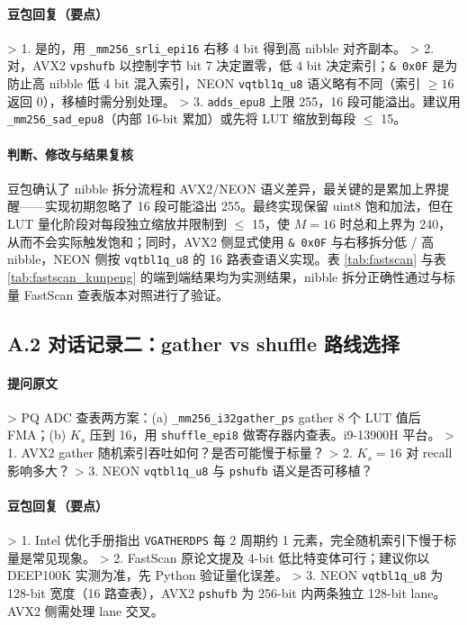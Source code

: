 \documentclass[a4paper,11pt,UTF8]{ctexart}
\begin{document}
\paragraph{豆包回复（要点）}

> 1. 是的，用 \texttt{\_mm256\_srli\_epi16} 右移 4 bit 得到高 nibble 对齐副本。
> 2. 对，AVX2 \texttt{vpshufb} 以控制字节 bit 7 决定置零，低 4 bit 决定索引；\texttt{\& 0x0F} 是为防止高 nibble 低 4 bit 混入索引，NEON \texttt{vqtbl1q\_u8} 语义略有不同（索引 $\ge 16$ 返回 0），移植时需分别处理。
> 3. \texttt{adds\_epu8} 上限 255，16 段可能溢出。建议用 \texttt{\_mm256\_sad\_epu8}（内部 16-bit 累加）或先将 LUT 缩放到每段 $\le$ 15。

\paragraph{判断、修改与结果复核}

豆包确认了 nibble 拆分流程和 AVX2/NEON 语义差异，最关键的是累加上界提醒——实现初期忽略了 16 段可能溢出 255。最终实现保留 uint8 饱和加法，但在 LUT 量化阶段对每段独立缩放并限制到 $\le$ 15，使 $M=16$ 时总和上界为 240，从而不会实际触发饱和；同时，AVX2 侧显式使用 \texttt{\& 0x0F} 与右移拆分低 / 高 nibble，NEON 侧按 \texttt{vqtbl1q\_u8} 的 16 路表查语义实现。表 \ref{tab:fastscan} 与表 \ref{tab:fastscan_kunpeng} 的端到端结果均为实测结果，nibble 拆分正确性通过与标量 FastScan 查表版本对照进行了验证。

\subsection*{A.2 对话记录二：gather vs shuffle 路线选择}

\paragraph{提问原文}

> PQ ADC 查表两方案：(a) \texttt{\_mm256\_i32gather\_ps} gather 8 个 LUT 值后 FMA；(b) $K_s$ 压到 16，用 \texttt{shuffle\_epi8} 做寄存器内查表。i9-13900H 平台。
> 1. AVX2 gather 随机索引吞吐如何？是否可能慢于标量？
> 2. $K_s=16$ 对 recall 影响多大？
> 3. NEON \texttt{vqtbl1q\_u8} 与 \texttt{pshufb} 语义是否可移植？

\paragraph{豆包回复（要点）}

> 1. Intel 优化手册指出 \texttt{VGATHERDPS} 每 2 周期约 1 元素，完全随机索引下慢于标量是常见现象。
> 2. FastScan 原论文提及 4-bit 低比特变体可行；建议你以 DEEP100K 实测为准，先 Python 验证量化误差。
> 3. NEON \texttt{vqtbl1q\_u8} 为 128-bit 宽度（16 路查表），AVX2 \texttt{pshufb} 为 256-bit 内两条独立 128-bit lane。AVX2 侧需处理 lane 交叉。
\end{document}
